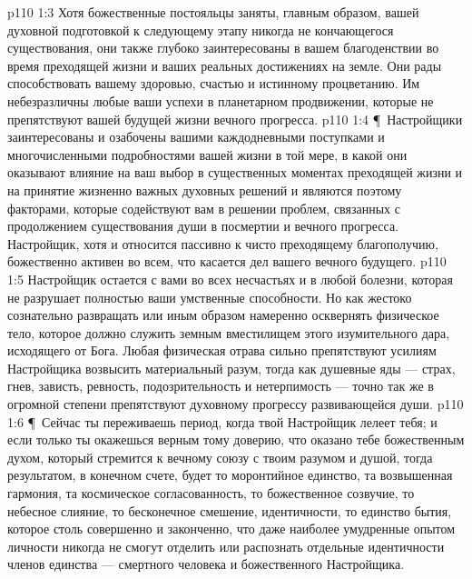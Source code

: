 \vs p110 1:3 Хотя божественные постояльцы заняты, главным образом, вашей духовной подготовкой к следующему этапу никогда не кончающегося существования, они также глубоко заинтересованы в вашем благоденствии во время преходящей жизни и ваших реальных достижениях на земле. Они рады способствовать вашему здоровью, счастью и истинному процветанию. Им небезразличны любые ваши успехи в планетарном продвижении, которые не препятствуют вашей будущей жизни вечного прогресса.
\vs p110 1:4 \P\ Настройщики заинтересованы и озабочены вашими каждодневными поступками и многочисленными подробностями вашей жизни в той мере, в какой они оказывают влияние на ваш выбор в существенных моментах преходящей жизни и на принятие жизненно важных духовных решений и являются поэтому факторами, которые содействуют вам в решении проблем, связанных с продолжением существования души в посмертии и вечного прогресса. Настройщик, хотя и относится пассивно к чисто преходящему благополучию, божественно активен во всем, что касается дел вашего вечного будущего.
\vs p110 1:5 Настройщик остается с вами во всех несчастьях и в любой болезни, которая не разрушает полностью ваши умственные способности. Но как жестоко сознательно развращать или иным образом намеренно осквернять физическое тело, которое должно служить земным вместилищем этого изумительного дара, исходящего от Бога. Любая физическая отрава сильно препятствуют усилиям Настройщика возвысить материальный разум, тогда как душевные яды --- страх, гнев, зависть, ревность, подозрительность и нетерпимость --- точно так же в огромной степени препятствуют духовному прогрессу развивающейся души.
\vs p110 1:6 \P\ Сейчас ты переживаешь период, когда твой Настройщик лелеет тебя; и если только ты окажешься верным тому доверию, что оказано тебе божественным духом, который стремится к вечному союзу с твоим разумом и душой, тогда результатом, в конечном счете, будет то моронтийное единство, та возвышенная гармония, та космическое согласованность, то божественное созвучие, то небесное слияние, то бесконечное смешение, идентичности, то единство бытия, которое столь совершенно и законченно, что даже наиболее умудренные опытом личности никогда не смогут отделить или распознать отдельные идентичности членов единства --- смертного человека и божественного Настройщика.
